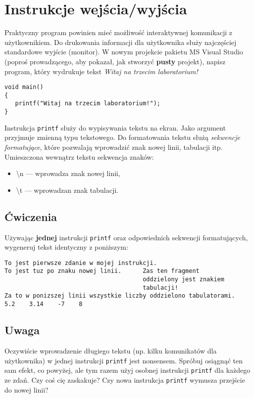 \documentclass{instrukcja}
\begin{document}
\author{B. Górecki}
\materialtitle
\materialtitle

\section{Instrukcje wejścia/wyjścia}

Praktyczny program powinien mieć możliwość interaktywnej komunikacji z użytkownikiem. Do drukowania informacji dla użytkownika służy najczęściej standardowe wyjście (monitor). W nowym projekcie pakietu MS Visual Studio (poproś prowadzącego, aby pokazał, jak stworzyć {\bf pusty} projekt), napisz program, który wydrukuje tekst {\it Witaj na trzecim laboratorium!}
\begin{verbatim}
void main()
{
   printf("Witaj na trzecim laboratorium!");
}
\end{verbatim}
Instrukcja {\tt printf} służy do wypisywania tekstu na ekran. Jako argument przyjmuje zmienną typu tekstowego. Do formatowania tekstu służą {\it sekwencje formatujące}, które pozwalają wprowadzić znak nowej linii, tabulacji itp. Umieszczona wewnątrz tekstu sekwencja znaków:
\begin{itemize}
\item \textbackslash{}n --- wprowadza znak nowej linii,
\item \textbackslash{}t --- wprowadzan znak tabulacji.
\end{itemize}

\subsection*{Ćwiczenia}
Używając {\bf jednej} instrukcji {\tt printf} oraz odpowiednich sekwencji formatujących, wygeneruj tekst identyczny z poniższym:
\begin{verbatim}
To jest pierwsze zdanie w mojej instrukcji.
To jest tuz po znaku nowej linii.      Zas ten fragment
                                       oddzielony jest znakiem
                                       tabulacji!
Za to w ponizszej linii wszystkie liczby oddzielono tabulatorami.
5.2    3.14    -7    8
\end{verbatim}
\subsection*{Uwaga}
Oczywiście wprowadzenie długiego tekstu (np. kilku komunikatów dla użytkownika) w jednej instrukcji {\tt printf} jest nonsensem. Spróbuj osiągnąć ten sam efekt, co powyżej, ale tym razem użyj osobnej instrukcji {\tt printf} dla każdego ze zdań. Czy coś cię zaskakuje? Czy nowa instrukcja {\tt printf} wymusza przejście do nowej linii?
\end{document}
